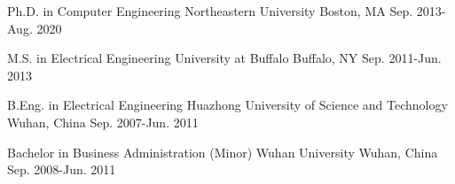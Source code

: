 \begin{cventries}

  \vspace{0.1cm}

  \cventry
  {Ph.D. in Computer Engineering}
  {Northeastern University}
  {Boston, MA}
  {Sep. 2013-Aug. 2020}
  {}

  \vspace{-0.5cm}

  \cventry
  {M.S. in Electrical Engineering}
  {University at Buffalo}
  {Buffalo, NY}
  {Sep. 2011-Jun. 2013}
  {}

  \vspace{-0.5cm}

  \cventry
  {B.Eng. in Electrical Engineering}
  {Huazhong University of Science and Technology}
  {Wuhan, China}
  {Sep. 2007-Jun. 2011}
  {}

  \vspace{-0.5cm}

  \cventry
  {Bachelor in Business Administration (Minor)}
  {Wuhan University}
  {Wuhan, China}
  {Sep. 2008-Jun. 2011}
  {}

  \vspace{-0.5cm}

\end{cventries}